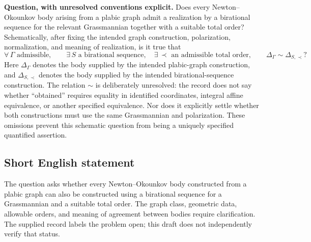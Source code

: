 \documentclass[11pt]{article}
\begin{document}
\textbf{Question, with unresolved conventions explicit.} Does every Newton--Okounkov body arising from a plabic graph admit a realization by a birational sequence for the relevant Grassmannian together with a suitable total order? Schematically, after fixing the intended graph construction, polarization, normalization, and meaning of realization, is it true that
\[
 \forall\,\Gamma\text{ admissible},\qquad
 \exists\,S\text{ a birational sequence},\quad
 \exists\,\prec\text{ an admissible total order},\qquad
 \Delta_{\Gamma}\sim\Delta_{S,\prec}?
\]
Here \(\Delta_{\Gamma}\) denotes the body supplied by the intended plabic-graph construction, and \(\Delta_{S,\prec}\) denotes the body supplied by the intended birational-sequence construction. The relation \(\sim\) is deliberately unresolved: the record does not say whether ``obtained'' requires equality in identified coordinates, integral affine equivalence, or another specified equivalence. Nor does it explicitly settle whether both constructions must use the same Grassmannian and polarization. These omissions prevent this schematic question from being a uniquely specified quantified assertion.
\subsection{Short English statement}
The question asks whether every Newton--Okounkov body constructed from a plabic graph can also be constructed using a birational sequence for a Grassmannian and a suitable total order. The graph class, geometric data, allowable orders, and meaning of agreement between bodies require clarification. The supplied record labels the problem open; this draft does not independently verify that status.
\end{document}
